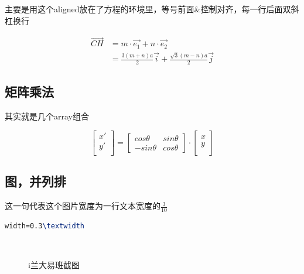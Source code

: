 \documentclass[AutoFakeBold]{LZUThesis2007}
\begin{document}
主要是用这个aligned放在了方程的环境里，等号前面\&控制对齐，每一行后面双斜杠换行

\begin{equation}
    \begin{aligned}
        \vec{CH} & = m\cdot \vec{e_1} + n\cdot \vec{e_2} \\
        & = \frac{3(m+n)a}{2} \vec{i} + \frac{\sqrt{3}(m-n)a}{2} \vec{j} 
    \end{aligned}
    \label{ch}
\end{equation}


\subsection{矩阵乘法} %
\label{sub:矩阵乘法}

其实就是几个array组合

\begin{equation}
    \left[ 
    \begin{array}{c}
    x'\\
    y'\\
    \end{array}
    \right]=
    \left[ 
    \begin{array}{cc}
    cos \theta & sin \theta \\
    - sin \theta & cos \theta 
    \end{array}
    \right]
    \cdot
    \left[ 
    \begin{array}{c}
        x\\
        y\\
    \end{array}
    \right]
\end{equation}


\subsection{图，并列排} %
\label{sub:图_并列排}

这一句代表这个图片宽度为一行文本宽度的$\frac{3}{10}$
\begin{lstlisting}[language = tex]
width=0.3\textwidth
\end{lstlisting}



\begin{figure}[H]
	\centering
	\\	
    \caption{i兰大易班截图}
    \label{fig_ldr}
\end{figure}
\end{document}
